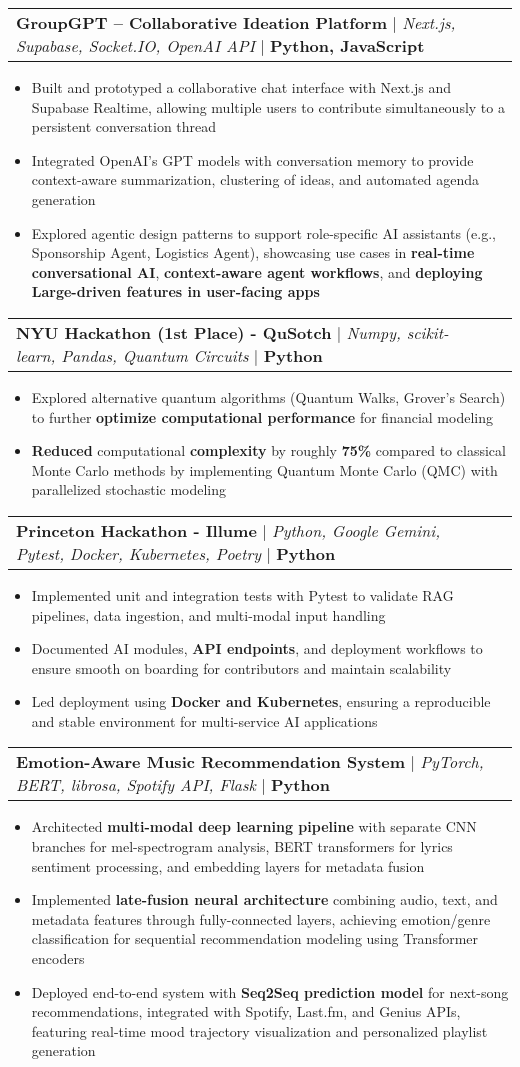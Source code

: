 \documentclass[letterpaper,10pt]{article}
\makeatletter
\newcommand{\resumeItem}[1]{
  \item\small{
    {#1 \vspace{-3pt}}
  }
}
\newcommand{\resumeProjectHeading}[2]{
    \item
    \begin{tabular*}{0.97\textwidth}{l@{\extracolsep{\fill}}r}
      \small#1 & #2 \\
    \end{tabular*}\vspace{-9pt}
}
\newcommand{\resumeItemListStart}{\begin{itemize}}
\newcommand{\resumeItemListEnd}{\end{itemize}\vspace{-7pt}}
\makeatother
\begin{document}
    \resumeProjectHeading
    {\textbf{GroupGPT – Collaborative Ideation Platform} $|$ \emph{Next.js, Supabase, Socket.IO, OpenAI API} $|$ \textbf{Python, JavaScript}}{}
  \resumeItemListStart
    \resumeItem{Built and prototyped a collaborative chat interface with Next.js and Supabase Realtime, allowing multiple users to contribute simultaneously to a persistent conversation thread}
    \resumeItem{Integrated OpenAI’s GPT models with conversation memory to provide context-aware summarization, clustering of ideas, and automated agenda generation}
    \resumeItem{Explored agentic design patterns to support role-specific AI assistants (e.g., Sponsorship Agent, Logistics Agent), showcasing use cases in \textbf{real-time conversational AI}, \textbf{context-aware agent workflows}, and \textbf{deploying Large-driven features in user-facing apps}}
  \resumeItemListEnd
    \vspace{-10pt}
      \resumeProjectHeading
         {\textbf{NYU Hackathon (1st Place) - QuSotch} $|$ \emph{Numpy, scikit-learn, Pandas, Quantum Circuits} $|$ \textbf{Python}}{}
          \resumeItemListStart
           \resumeItem{Explored alternative quantum algorithms (Quantum Walks, Grover’s Search) to further \textbf{optimize computational performance} for financial modeling}
           \resumeItem{\textbf{Reduced} computational \textbf{complexity} by roughly\textbf{ 75\% }compared to classical Monte Carlo methods by implementing Quantum Monte Carlo (QMC) with parallelized stochastic modeling}
          \resumeItemListEnd

        \resumeProjectHeading
        {\textbf{Princeton Hackathon - Illume} $|$ \emph{Python, Google Gemini, Pytest, Docker, Kubernetes, Poetry } $|$ \textbf{Python}}{}
          \resumeItemListStart
           \resumeItem{Implemented unit and integration tests with Pytest to validate RAG pipelines, data ingestion, and multi-modal input handling}
           \resumeItem{Documented AI modules, \textbf{API endpoints}, and deployment workflows to ensure smooth on boarding for contributors and maintain scalability}
           \resumeItem{Led deployment using \textbf{Docker and Kubernetes}, ensuring a reproducible and stable environment for multi-service AI applications}
          \resumeItemListEnd

        \resumeProjectHeading
            {\textbf{Emotion-Aware Music Recommendation System} $|$ \emph{PyTorch, BERT, librosa, Spotify API, Flask} $|$ \textbf{Python}}{}
          \resumeItemListStart
           \resumeItem{Architected \textbf{multi-modal deep learning pipeline} with separate CNN branches for mel-spectrogram analysis, BERT transformers for lyrics sentiment processing, and embedding layers for metadata fusion}
           \resumeItem{Implemented \textbf{late-fusion neural architecture} combining audio, text, and metadata features through fully-connected layers, achieving emotion/genre classification for sequential recommendation modeling using Transformer encoders}
            \resumeItem{Deployed end-to-end system with \textbf{Seq2Seq prediction model} for next-song recommendations, integrated with Spotify, Last.fm, and Genius APIs, featuring real-time mood trajectory visualization and personalized playlist generation}
          \resumeItemListEnd
\end{document}
